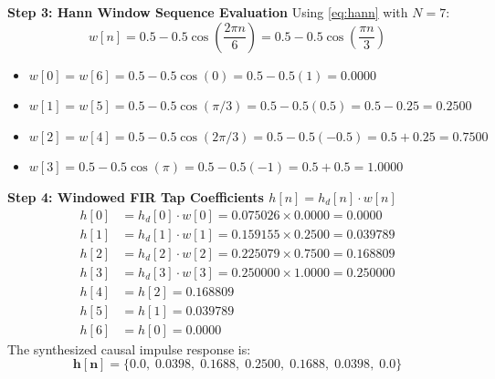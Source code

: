 \documentclass[11pt,a4paper]{article}
\begin{document}
\vspace{1mm}
\noindent\textbf{Step 3: Hann Window Sequence Evaluation}
Using \eqref{eq:hann} with $N = 7$:
\begin{equation}
w[n] = 0.5 - 0.5\cos\left( \frac{2\pi n}{6} \right) = 0.5 - 0.5\cos\left( \frac{\pi n}{3} \right)
\end{equation}
\begin{itemize}
    \item $w[0] = w[6] = 0.5 - 0.5\cos(0) = 0.5 - 0.5(1) = \mathbf{0.0000}$
    \item $w[1] = w[5] = 0.5 - 0.5\cos(\pi/3) = 0.5 - 0.5(0.5) = 0.5 - 0.25 = \mathbf{0.2500}$
    \item $w[2] = w[4] = 0.5 - 0.5\cos(2\pi/3) = 0.5 - 0.5(-0.5) = 0.5 + 0.25 = \mathbf{0.7500}$
    \item $w[3] = 0.5 - 0.5\cos(\pi) = 0.5 - 0.5(-1) = 0.5 + 0.5 = \mathbf{1.0000}$
\end{itemize}

\vspace{1mm}
\noindent\textbf{Step 4: Windowed FIR Tap Coefficients $h[n] = h_d[n] \cdot w[n]$}
\begin{align}
h[0] &= h_d[0] \cdot w[0] = 0.075026 \times 0.0000 = \mathbf{0.0000} \\
h[1] &= h_d[1] \cdot w[1] = 0.159155 \times 0.2500 = \mathbf{0.039789} \\
h[2] &= h_d[2] \cdot w[2] = 0.225079 \times 0.7500 = \mathbf{0.168809} \\
h[3] &= h_d[3] \cdot w[3] = 0.250000 \times 1.0000 = \mathbf{0.250000} \\
h[4] &= h[2] = \mathbf{0.168809} \\
h[5] &= h[1] = \mathbf{0.039789} \\
h[6] &= h[0] = \mathbf{0.0000}
\end{align}
The synthesized causal impulse response is:
\begin{equation}
\mathbf{h[n] = \{0.0, \; 0.0398, \; 0.1688, \; 0.2500, \; 0.1688, \; 0.0398, \; 0.0\}}
\end{equation}
\end{document}
